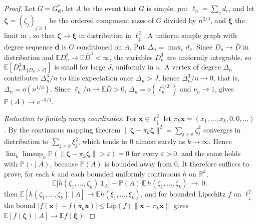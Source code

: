 \documentclass[11pt]{amsart}
\theoremstyle{remark}
\numberwithin{equation}{section}
\newcommand{\PP}{\mathbb{P}}
\newcommand{\EE}{\mathbb{E}}
\newcommand{\ldown}{\ell^2_{\downarrow}}
\begin{document}
\begin{proof}
Let $G=G^*_{\boldsymbol d}$, let $A$ be the event that $G$ is simple, put $\ell_n=\sum_vd_v$, and let $\boldsymbol\zeta=(\zeta_j)_{j\ge1}$ be the ordered component sizes of $G$ divided by $n^{2/3}$, and $\boldsymbol\xi$ the limit in \cite[Theorem~1]{DHLS17}, so that $\boldsymbol\zeta\to\boldsymbol\xi$ in distribution in $\ldown$. A uniform simple graph with degree sequence $\boldsymbol d$ is $G$ conditioned on $A$. Put $\Delta_n=\max_vd_v$. Since $D_n\to\bar D$ in distribution and $\EE D_n^3\to\EE\bar D^3<\infty$, the variables $D_n^3$ are uniformly integrable, so $\EE[D_n^3\mathbf 1_{\{D_n>J\}}]$ is small for large $J$, uniformly in $n$. A vertex of degree $\Delta_n$ contributes $\Delta_n^3/n$ to this expectation once $\Delta_n>J$, hence $\Delta_n^3/n\to0$, that is, $\Delta_n=o(n^{1/3})$. Since $\ell_n/n\to\EE\bar D>0$, $\Delta_n=o(\ell_n^{1/2})$ and $\nu_n\to1$, \cite[Corollary~1.5]{Ja09} gives $\PP(A)\to e^{-3/4}$.

\emph{Reduction to finitely many coordinates.} For $\boldsymbol x\in\ldown$ let $\pi_k\boldsymbol x=(x_1,\dots,x_k,0,0,\dots)$. By the continuous mapping theorem $\|\boldsymbol\zeta-\pi_k\boldsymbol\zeta\|^2=\sum_{j>k}\zeta_j^2$ converges in distribution to $\sum_{j>k}\xi_j^2$, which tends to $0$ almost surely as $k\to\infty$. Hence $\lim_k\limsup_n\PP(\|\boldsymbol\zeta-\pi_k\boldsymbol\zeta\|>\varepsilon)=0$ for every $\varepsilon>0$, and the same holds with $\PP(\cdot\mid A)$, because $\PP(A)$ is bounded away from $0$. It therefore suffices to prove, for each $k$ and each bounded uniformly continuous $h$ on $\mathbb R^k$,
\begin{equation}\label{eq:indep}
\EE\bigl[h(\zeta_1,\dots,\zeta_k)\,\mathbf 1_A\bigr]-\PP(A)\,\EE\,h(\zeta_1,\dots,\zeta_k)\ \to\ 0 ;
\end{equation}
then $\EE[h(\zeta_1,\dots,\zeta_k)\mid A]\to\EE h(\xi_1,\dots,\xi_k)$, and for bounded Lipschitz $f$ on $\ldown$ the bound $|f(\boldsymbol x)-f(\pi_k\boldsymbol x)|\le\mathrm{Lip}(f)\|\boldsymbol x-\pi_k\boldsymbol x\|$ gives $\EE[f(\boldsymbol\zeta)\mid A]\to\EE f(\boldsymbol\xi)$.


\end{proof}
\end{document}

